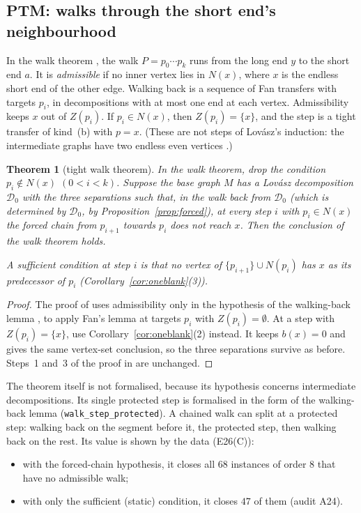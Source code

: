 \documentclass[11pt]{amsart}
\newtheorem{theorem}{Theorem}[section]
\theoremstyle{definition}
\newcommand{\cD}{\mathcal D}
\begin{document}
\subsection{PTM: walks through the short end's neighbourhood}
In the walk theorem \cite[Theorem~4.2]{TM}, the walk $P=p_0\cdots p_k$ runs from the long end $y$ to
the short end $a$. It is \emph{admissible} if no inner vertex lies in $N(x)$, where $x$ is the
endless short end of the other edge. Walking back \cite[Lemma~3.4]{TM} is a sequence of Fan
transfers with targets $p_i$, in decompositions with at most one end at each vertex. Admissibility
keeps $x$ out of $Z(p_i)$. If $p_i\in N(x)$, then $Z(p_i)=\{x\}$, and the step is a tight transfer
of kind~(b) with $p=x$. (These are not steps of Lov\'asz's induction: the intermediate graphs have
two endless even vertices \cite[Remark~4.3]{TM}.)

\begin{theorem}[tight walk theorem]\label{thm:tightwalk}
In the walk theorem, drop the condition $p_i\notin N(x)$ $(0<i<k)$. Suppose the base graph $M$ has a
Lov\'asz decomposition $\cD_0$ with the three separations such that, in the walk back from $\cD_0$
(which is determined by $\cD_0$, by Proposition~\ref{prop:forced}), at every step $i$ with
$p_i\in N(x)$ the forced chain from $p_{i+1}$ towards $p_i$ does not reach $x$. Then the conclusion
of the walk theorem holds.

A sufficient condition at step $i$ is that no vertex of $\{p_{i+1}\}\cup N(p_i)$ has $x$ as its
predecessor of $p_i$ (Corollary~\ref{cor:oneblank}(3)).
\end{theorem}

\begin{proof}
The proof of \cite[Theorem~4.2]{TM} uses admissibility only in the hypothesis of the walking-back
lemma \cite[Lemma~3.4]{TM}, to apply Fan's lemma at targets $p_i$ with $Z(p_i)=\emptyset$. At a step
with $Z(p_i)=\{x\}$, use Corollary~\ref{cor:oneblank}(2) instead. It keeps $b(x)=0$ and gives the
same vertex-set conclusion, so the three separations survive as before. Steps~1 and~3 of the proof in
\cite{TM} are unchanged.
\end{proof}

The theorem itself is not formalised, because its hypothesis concerns intermediate
decompositions. Its single protected step is formalised in the form of the walking-back lemma
(\texttt{walk\_step\_protected}). A chained walk can split at a protected step: walking back on
the segment before it, the protected step, then walking back on the rest. Its value is shown by the
data (E26(C)):
\begin{itemize}
\item with the forced-chain hypothesis, it closes all $68$ instances of order $8$ that have no
admissible walk;
\item with only the sufficient (static) condition, it closes $47$ of them (audit A24).
\end{itemize}
\end{document}
